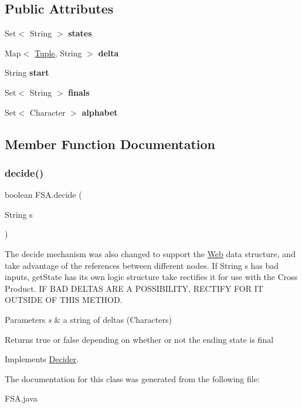 \subsection*{Public Attributes}
\begin{DoxyCompactItemize}
\item 
\mbox{\label{class_f_s_a_a9f7442588d7f5ed33072a7bc258324bb}} 
Set$<$ String $>$ {\bfseries states}
\item 
\mbox{\label{class_f_s_a_ae1306963959ee001cdde22639135d183}} 
Map$<$ \mbox{\hyperlink{class_tuple}{Tuple}}, String $>$ {\bfseries delta}
\item 
\mbox{\label{class_f_s_a_a1ba72f24e383d1a0e4677d9d5e73e3eb}} 
String {\bfseries start}
\item 
\mbox{\label{class_f_s_a_ab837225e277ed440c8c44c47dd484b78}} 
Set$<$ String $>$ {\bfseries finals}
\item 
\mbox{\label{class_f_s_a_a2cf220c836a7d1d9a922378fccf7db57}} 
Set$<$ Character $>$ {\bfseries alphabet}
\end{DoxyCompactItemize}


\subsection{Member Function Documentation}
\mbox{\label{class_f_s_a_ae397e97abea4e09b0f8487d7caf70104}} 
\subsubsection{\texorpdfstring{decide()}{decide()}}
{\footnotesize\ttfamily boolean F\+S\+A.\+decide (\begin{DoxyParamCaption}\item[{String}]{s }\end{DoxyParamCaption})\hspace{0.3cm}{\ttfamily [inline]}}

The decide mechanism was also changed to support the \mbox{\hyperlink{class_web}{Web}} data structure, and take advantage of the references between different nodes. If String s has bad inputs, get\+State has its own logic structure take rectifies it for use with the Cross Product. IF B\+AD D\+E\+L\+T\+AS A\+RE A P\+O\+S\+S\+I\+B\+I\+L\+I\+TY, R\+E\+C\+T\+I\+FY F\+OR IT O\+U\+T\+S\+I\+DE OF T\+H\+IS M\+E\+T\+H\+OD. 
\begin{DoxyParams}{Parameters}
{\em s} & a string of deltas (Characters) \\
\hline
\end{DoxyParams}
\begin{DoxyReturn}{Returns}
true or false depending on whether or not the ending state is final 
\end{DoxyReturn}


Implements \mbox{\hyperlink{interface_decider}{Decider}}.



The documentation for this class was generated from the following file\+:\begin{DoxyCompactItemize}
\item 
F\+S\+A.\+java\end{DoxyCompactItemize}

